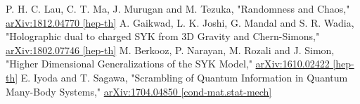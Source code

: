 \begin{thebibliography}{99}
	P. H. C. Lau, C. T. Ma, J. Murugan and M. Tezuka,
	"Randomness and Chaos,"
	\href{https://arxiv.org/pdf/1812.04770.pdf}{arXiv:1812.04770 [hep-th]}
	A. Gaikwad, L. K. Joshi, G. Mandal and S. R. Wadia,
	"Holographic dual to charged SYK from 3D Gravity and Chern-Simons,"
	\href{https://arxiv.org/pdf/1802.07746.pdf}{arXiv:1802.07746 [hep-th]}
	M. Berkooz, P. Narayan, M. Rozali and J. Simon,
	"Higher Dimensional Generalizations of the SYK Model,"
	\href{https://arxiv.org/pdf/1610.02422.pdf}{arXiv:1610.02422 [hep-th]}
		E. Iyoda and T. Sagawa,
		"Scrambling of Quantum Information in Quantum Many-Body Systems,"
		\href{https://arxiv.org/pdf/1704.04850.pdf}{arXiv:1704.04850 [cond-mat.stat-mech]}
\end{thebibliography}
